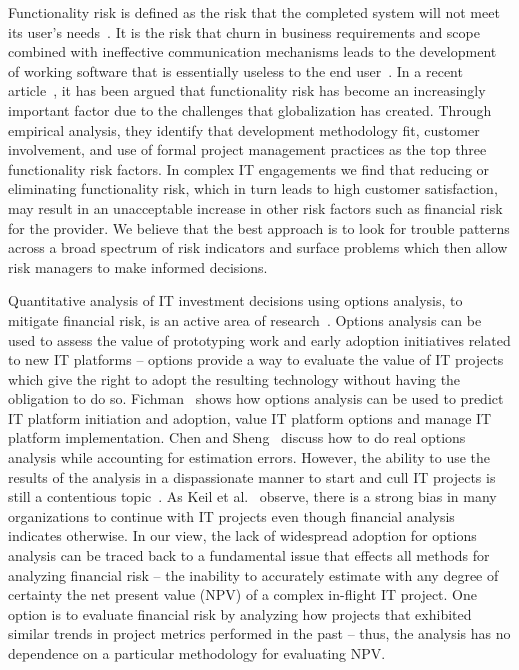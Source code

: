 Functionality risk is defined as the risk that the completed system will not meet its user's needs~\cite{risk11}.  It is the risk that churn in business requirements and scope combined with ineffective communication mechanisms leads to the development of working software that is essentially useless to the end user~\cite{risk12}. In a recent article~\cite{risk13}, it has been argued that functionality risk has become an increasingly important factor due to the challenges  that globalization has created. Through empirical analysis, they identify that development methodology fit, customer involvement, and use of formal project management practices as the top three functionality risk factors. In complex IT engagements we find that reducing or eliminating functionality risk, which in turn leads to high customer satisfaction, may result in an unacceptable increase in other risk factors such as financial risk for the provider. We believe that the best approach is to look for trouble patterns across a broad spectrum of risk indicators and surface problems which then allow risk managers to make informed decisions.

Quantitative analysis of IT investment decisions using options analysis, to mitigate financial risk, is an active area of research~\cite{14,15,16}. Options analysis can be used to assess the value of prototyping work and early adoption initiatives related to new IT platforms – options provide a way to evaluate the value of IT projects which give the right to adopt the resulting technology without having the obligation to do so. Fichman~\cite{risk14} shows how options analysis can be used to predict IT platform initiation and adoption, value IT platform options and manage IT platform implementation. Chen and Sheng~\cite{risk15} discuss how to do real options analysis while accounting for estimation errors. However, the ability to use the results of the analysis in a dispassionate manner to start and cull IT projects is still a contentious topic~\cite{risk17}. As Keil et al.~\cite{risk18} observe, there is a strong bias in many organizations to continue with IT projects even though financial analysis indicates otherwise. In our view, the lack of widespread adoption for options analysis can be traced back to a fundamental issue that effects all methods for analyzing financial risk – the inability to accurately estimate with any degree of certainty the net present value (NPV) of a complex in-flight IT project. One option is to evaluate financial risk by analyzing how projects that exhibited similar trends in project metrics performed in the past – thus, the analysis has no dependence on a particular methodology for evaluating NPV.

